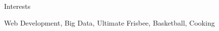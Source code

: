 \documentclass{resume} %
\begin{document}

\begin{rSection}{Interests}

Web Development, Big Data, Ultimate Frisbee, Basketball, Cooking

\end{rSection}





\end{document}
